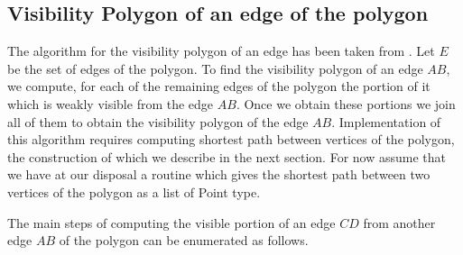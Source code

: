 \documentclass[a4paper,10pt]{article}
\begin{document}
\subsection{Visibility Polygon of an edge of the polygon}
The algorithm for the visibility polygon of an edge has been taken from \cite{key3}.
Let $E$ be the set of edges of the polygon. To find the visibility polygon of an edge $AB$, we compute, for each of 
 the remaining edges of the polygon the portion of it which is weakly visible from the edge $AB$. Once we obtain these portions we join
 all of them to obtain the visibility polygon of the edge $AB$.
  Implementation of this algorithm requires computing shortest path between vertices of the polygon, the construction of which we 
describe in the next section. For now assume that we have at our disposal a routine which gives the shortest path between two vertices 
of the polygon as a list of Point type.

The main steps of computing the visible portion of an edge $CD$ from another edge $AB$ of the polygon can be enumerated as follows.
\end{document}
